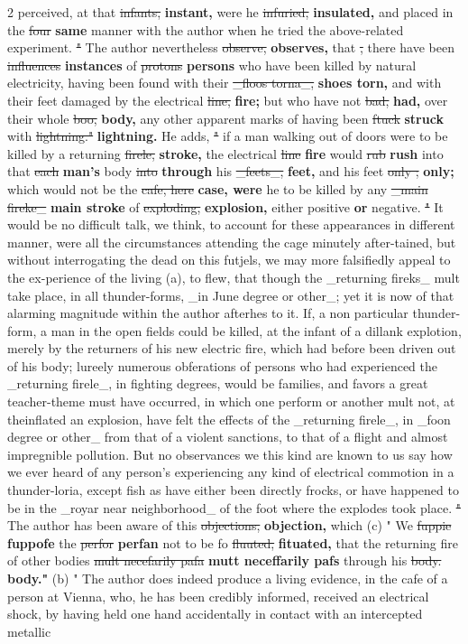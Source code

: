 \documentclass[10pt]{article}
\begin{document}
\begin{multicols}{2}
perceived, at that \sout{infants,} \textbf{instant,} were he \sout{infuried,} \textbf{insulated,} and placed in the \sout{four} \textbf{same} manner with the author when he tried the above-related experiment. \sout{"} The author nevertheless \sout{observe,} \textbf{observes,} that \sout{,} there have been \sout{influences} \textbf{instances} of \sout{protons} \textbf{persons} who have been killed by natural electricity, having been found with their \sout{\_floos torna\_,} \textbf{shoes torn,} and with their feet damaged by the electrical \sout{line,} \textbf{fire;} but who have not \sout{bad,} \textbf{had,} over their whole \sout{boo,} \textbf{body,} any other apparent marks of having been \sout{ftuck} \textbf{struck} with \sout{lightning."} \textbf{lightning.} He adds, \sout{"} if a man walking out of doors were to be killed by a returning \sout{firele,} \textbf{stroke,} the electrical \sout{line} \textbf{fire} would \sout{rub} \textbf{rush} into that \sout{each} \textbf{man's} body \sout{into} \textbf{through} his \sout{\_feets\_,} \textbf{feet,} and his feet \sout{only ;} \textbf{only;} which would not be the \sout{cafe, here} \textbf{case, were} he to be killed by any \sout{\_main fireke\_} \textbf{main stroke} of \sout{exploding,} \textbf{explosion,} either positive \textbf{or} negative. \sout{"} It would be no difficult talk, we think, to account for these appearances in different manner, were all the circumstances attending the cage minutely after-tained, but without interrogating the dead on this futjels, we may more falsifiedly appeal to the ex-perience of the living (a), to flew, that though the \_returning fireks\_ mult take place, in all thunder-forms, \_in June degree or other\_; yet it is now of that alarming magnitude within the author afterhes to it. If, a non particular thunder-form, a man in the open fields could be killed, at the infant of a dillank explotion, merely by the returners of his new electric fire, which had before been driven out of his body; lureely numerous obferations of persons who had experienced the \_returning firele\_, in fighting degrees, would be families, and favors a great teacher-theme must have occurred, in which one perform or another mult not, at theinflated an explosion, have felt the effects of the \_returning firele\_, in \_foon degree or other\_ from that of a violent sanctions, to that of a flight and almost impregnible pollution. But no observances we this kind are known to us say how we ever heard of any person's experiencing any kind of electrical commotion in a thunder-loria, except fish as have either been directly frocks, or have happened to be in the \_royar near neighborhood\_ of the foot where the explodes took place. \sout{"} The author has been aware of this \sout{objections,} \textbf{objection,} which (c) " We \sout{fuppie} \textbf{fuppofe} the \sout{perfor} \textbf{perfan} not to be fo \sout{fluuted,} \textbf{fituated,} that the returning fire of other bodies \sout{mult necefarily pafa} \textbf{mutt neceffarily pafs} through his \sout{body.} \textbf{body."} (b) " The author does indeed produce a living evidence, in the cafe of a person at Vienna, who, he has been credibly informed, received an electrical shock, by having held one hand accidentally in contact with an intercepted metallic 
\end{multicols}
\end{document}
